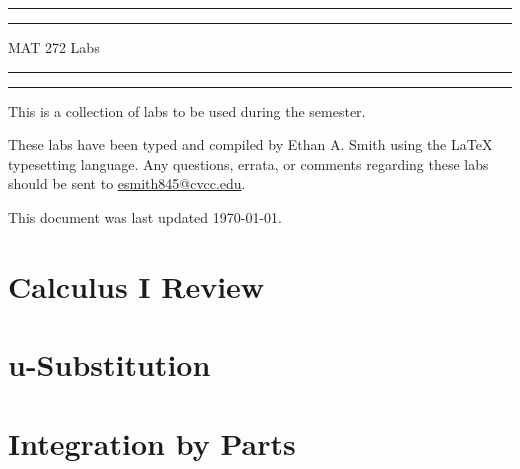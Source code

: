 \documentclass[twoside, addpoints, 12pt, letterpage]{exam}
\begin{document}
\begin{coverpages}
\scshape
\centering
\rule{\textwidth}{1.6pt}\vspace*{-\baselineskip}\vspace*{2pt}
\rule{\textwidth}{0.4pt} %

\vspace{0.75\baselineskip}
    
    {\Huge MAT 272 Labs}
    

\rule{\textwidth}{0.4pt}\vspace*{-\baselineskip}\vspace{3.2pt}
\rule{\textwidth}{1.6pt} %

\vspace{0.75\baselineskip}

This is a collection of labs to be used during the \sem semester.

\vspace{3\baselineskip}

These labs have been typed and compiled by Ethan A. Smith using the \LaTeX\, typesetting language. Any questions, errata, or comments regarding these labs should be sent to \href{mailto:esmith845@cvcc.edu}{esmith845@cvcc.edu}.




\vspace{3\baselineskip}
This document was last updated \usdate\today.

\tableofcontents
\cleardoublepage
\end{coverpages}

\section{Calculus I Review}
\cleardoublepage

\section{u-Substitution}
\cleardoublepage

\section{Integration by Parts}
\cleardoublepage
\end{document}
